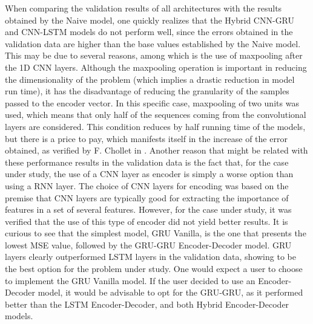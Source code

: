 When comparing the validation results of all architectures with the results obtained by the Naive model, one quickly realizes that the Hybrid \ac{CNN}-\ac{GRU} and \ac{CNN}-\ac{LSTM} models do not perform well, since the errors obtained in the validation data are higher than the base values established by the Naive model. This may be due to several reasons, among which is the use of maxpooling after the \ac{1D CNN} layers. Although the maxpooling operation is important in reducing the dimensionality of the problem (which implies a drastic reduction in model run time), it has the disadvantage of reducing the granularity of the samples passed to the encoder vector. In this specific case, maxpooling of two units was used, which means that only half of the sequences coming from the convolutional layers are considered. This condition reduces by half running time of the models, but there is a price to pay, which manifests itself in the increase of the error obtained, as verified by F. Chollet in \cite{cnn1}. Another reason that might be related with these performance results in the validation data is the fact that, for the case under study, the use of a \ac{CNN} layer as encoder is simply a worse option than using a \ac{RNN} layer. The choice of \ac{CNN} layers for encoding was based on the premise that \ac{CNN} layers are typically good for extracting the importance of features in a set of several features. However, for the case under study, it was verified that the use of this type of encoder did not yield better results. It is curious to see that the simplest model, \ac{GRU} Vanilla, is the one that presents the lowest \ac{MSE} value, followed by the \ac{GRU}-\ac{GRU} Encoder-Decoder model. \ac{GRU} layers clearly outperformed \ac{LSTM} layers in the validation data, showing to be the best option for the problem under study. One would expect a user to choose to implement the \ac{GRU} Vanilla model. If the user decided to use an Encoder-Decoder model, it would be advisable to opt for the \ac{GRU}-\ac{GRU}, as it performed better than the \ac{LSTM} Encoder-Decoder, and both Hybrid Encoder-Decoder models. 

